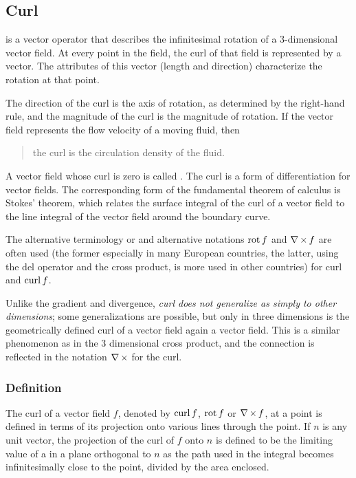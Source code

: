 \subsection{Curl}
 is a vector operator that describes the infinitesimal rotation of a 3-dimensional vector field. At every point in the field, the curl of that field is represented by a vector. The attributes of this vector (length and direction) characterize the rotation at that point.

The direction of the curl is the axis of rotation, as determined by the right-hand rule, and the magnitude of the curl is the magnitude of rotation. If the vector field represents the flow velocity of a moving fluid, then 
\begin{quote}
the curl is the circulation density of the fluid. 
\end{quote}
A vector field whose curl is zero is called . The curl is a form of differentiation for vector fields. The corresponding form of the fundamental theorem of calculus is Stokes' theorem, which relates the surface integral of the curl of a vector field to the line integral of the vector field around the boundary curve.

The alternative terminology  or  and alternative notations $\operatorname{rot} f$ and $\nabla\operatorname{\times} f$ are often used (the former especially in many European countries, the latter, using the del operator and the cross product, is more used in other countries) for curl and $\operatorname{curl} f$.

Unlike the gradient and divergence, \emph{curl does not generalize as simply to other dimensions}; some generalizations are possible, but only in three dimensions is the geometrically defined curl of a vector field again a vector field. This is a similar phenomenon as in the 3 dimensional cross product, and the connection is reflected in the notation $\nabla\operatorname{\times}$ for the curl.


\subsubsection{Definition}
The curl of a vector field $f$, denoted by $\operatorname{curl} f$, $\operatorname{rot} f$ or $\nabla\operatorname{\times} f$, at a point is defined in terms of its projection onto various lines through the point. If $n$ is any unit vector, the projection of the curl of $f$ onto $n$ is defined to be the limiting value of a  in a plane orthogonal to $n$ as the path used in the integral becomes infinitesimally close to the point, divided by the area enclosed.

